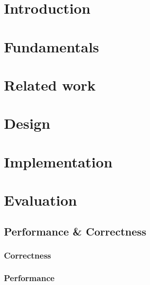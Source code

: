 \documentclass[
	11pt,
	a4paper,
	usegeometry,
	twoside,
	openright,
	toc=chapterentrywithdots
]{scrbook}
\begin{document}
	
	
	\tableofcontents
	\thispagestyle{empty}
	\clearpage
	
	
	\chapter{Introduction}
	
		
	
	\chapter{Fundamentals}
	\label{chap:fundamentals}
	
		
		
	\chapter{Related work}
	\label{chap:related-work}
	
		
	
	\chapter{Design}
	\label{chap:design}
	
		
	
	\chapter{Implementation}
	\label{chap:implementation}
	
		
	
	\chapter{Evaluation}
	\label{chap:evaluation}
	
		\section{Performance \& Correctness}
		
			\subsection{Correctness}
			
			\subsection{Performance}
			
\end{document}
